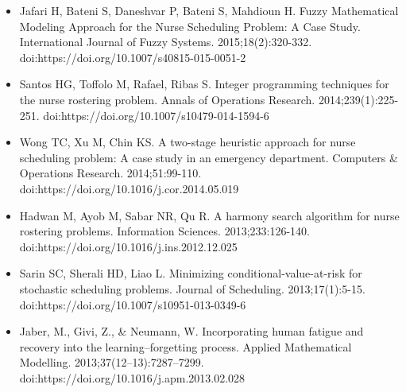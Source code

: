 \documentclass[10pt,a4paper,twocolumn]{article}
\begin{document}
\begin{itemize}[leftmargin=*]
\item [27] Jafari H, Bateni S, Daneshvar P, Bateni S, Mahdioun H. Fuzzy Mathematical Modeling Approach for the Nurse Scheduling Problem: A Case Study. International Journal of Fuzzy Systems. 2015;18(2):320-332. doi:https://doi.org/10.1007/s40815-015-0051-2
\item [28] Santos HG, Toffolo M, Rafael, Ribas S. Integer programming techniques for the nurse rostering problem. Annals of Operations Research. 2014;239(1):225-251. doi:https://doi.org/10.1007/s10479-014-1594-6
\item [29] Wong TC, Xu M, Chin KS. A two-stage heuristic approach for nurse scheduling problem: A case study in an emergency department. Computers \& Operations Research. 2014;51:99-110. doi:https://doi.org/10.1016/j.cor.2014.05.019
\item [30] Hadwan M, Ayob M, Sabar NR, Qu R. A harmony search algorithm for nurse rostering problems. Information Sciences. 2013;233:126-140. doi:https://doi.org/10.1016/j.ins.2012.12.025
\item [31] Sarin SC, Sherali HD, Liao L. Minimizing conditional-value-at-risk for stochastic scheduling problems. Journal of Scheduling. 2013;17(1):5-15. doi:https://doi.org/10.1007/s10951-013-0349-6
\item [32] Jaber, M., Givi, Z., \& Neumann, W. Incorporating human fatigue and recovery into the learning–forgetting process. Applied Mathematical Modelling. 2013;37(12–13):7287–7299. doi:https://doi.org/10.1016/j.apm.2013.02.028
\end{itemize}
\end{document}
